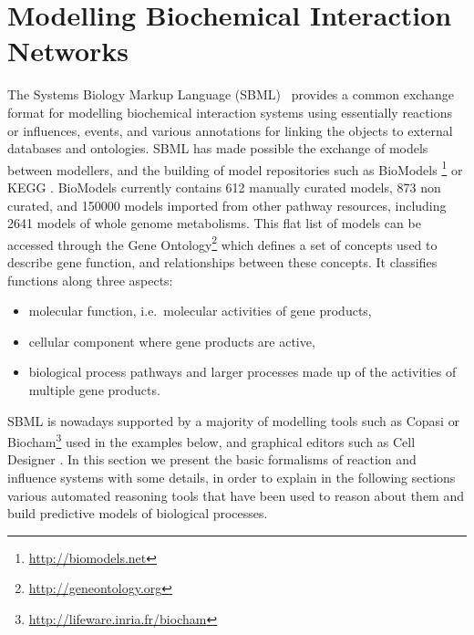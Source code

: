 \documentclass[graybox]{svmult}
\begin{document}
\section{Modelling Biochemical Interaction Networks}\label{modelling}




The Systems Biology Markup Language (SBML)~\cite{Hucka03bi,Hucka08sbml2}
provides a common exchange format for modelling biochemical interaction systems
using essentially reactions or influences, events, and various annotations for linking the objects to external databases and ontologies.
SBML has made possible the exchange of models between modellers,
and the building of model repositories such as BioModels \cite{NBBCDDLSSSSH06nar}\footnote{\url{http://biomodels.net}} or KEGG \cite{KG00nar}.
BioModels currently contains 612 manually curated models, 873 non curated,
and 150000 models imported from other pathway resources, including 2641 models of whole genome metabolisms.
This flat list of models can be accessed through
the Gene Ontology\footnote{\url{http://geneontology.org}}
which defines a set of concepts used to describe gene function, and relationships between these concepts. It classifies functions along three aspects:
\begin{itemize}
\item
molecular function, i.e.~molecular activities of gene products,
\item cellular component
where gene products are active,
\item biological process pathways and larger processes made up of the activities of multiple gene products.
\end{itemize}

SBML is nowadays supported by a majority of modelling tools such as Copasi \cite{copasi} or Biocham\footnote{\url{http://lifeware.inria.fr/biocham}} \cite{CFS06bi} used in the examples below,
and graphical editors such as Cell Designer \cite{FMJMKK08ieee}.
In this section we present the basic formalisms of reaction and influence systems with some details, 
in order to explain in the following sections various automated reasoning tools that have been used to reason about them
and build predictive models of biological processes.
\end{document}

